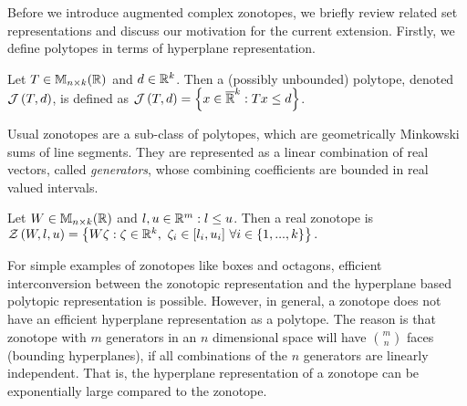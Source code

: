 
Before we introduce augmented complex zonotopes, we briefly review
related set representations and discuss our motivation for the
current extension.
Firstly, we define polytopes in terms of hyperplane representation.
%
\begin{definition}
Let $T\in\mathbb{M}_{n\times k}(\mathbb{\mathbb{R}})$ and $d\in\mathbb{R}^k$.  Then a (possibly
unbounded) polytope, denoted $\mathcal{J}\left(T,d\right)$, is defined as
$\mathcal{J}\left(T,d\right) = \left\{x\in\mathbb{\overline{R}}^k: Tx\leq d\right\}$.
\end{definition}
%
Usual zonotopes are a sub-class of polytopes, which are geometrically
Minkowski sums of line segments.  They are represented as a linear
combination of real vectors, called \emph{generators}, whose combining
coefficients are bounded in real valued intervals.
\begin{definition}
Let $W\in\mathbb{M}_{n\times k}(\mathbb{\mathbb{R}})$ and $l,u\in\mathbb{R}^m: l\leq u$.  Then 
 a real zonotope is
$\mathcal{Z}\left(W,l,u\right) = \left\{W\zeta: \zeta\in\mathbb{R}^k,~\zeta_i\in[l_i,u_i]~\forall i\in \{1,...,k\}\right\}.$
\end{definition}
%
For simple examples of zonotopes like boxes and octagons, efficient
interconversion between the zonotopic representation and the
hyperplane based polytopic representation is possible.  However, in
general, a zonotope does not have an efficient hyperplane
representation as a polytope.  The reason is that zonotope with $m$
generators in an $n$ dimensional space will have ${m}\choose{n}$ faces
(bounding hyperplanes), if all combinations of the $n$ generators are
linearly independent.  That is, the hyperplane representation of a
zonotope can be exponentially large compared to the zonotope.

